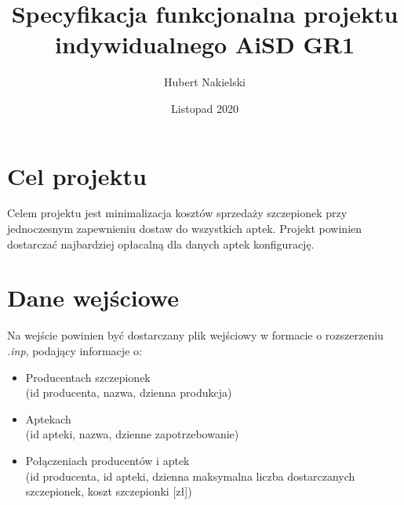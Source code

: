 \documentclass[]{article}
\title{Specyfikacja funkcjonalna projektu indywidualnego \textbf{AiSD GR1}}
\author{Hubert Nakielski}
\date{Listopad 2020}
\begin{document}
\maketitle

\section{Cel projektu}
Celem projektu jest minimalizacja kosztów sprzedaży szczepionek przy jednoczesnym
 zapewnieniu dostaw do wszystkich aptek. Projekt powinien dostarczać najbardziej opłacalną 
 dla danych aptek konfigurację.
 
\section{Dane wejściowe}
Na wejście powinien być dostarczany plik wejściowy w formacie o rozszerzeniu \textit{.inp}, podający informacje o: \\
	\begin{itemize}
		\item
		Producentach szczepionek \\
		(id producenta, nazwa, dzienna produkcja)\\
		\item
		Aptekach\\ (id apteki, nazwa, dzienne zapotrzebowanie)\\
		\item
		Połączeniach producentów i aptek \\(id producenta, id apteki, dzienna maksymalna liczba dostarczanych szczepionek, koszt 
		szczepionki [zł])
	\end{itemize}

\begin{table}[h!]
	\caption{Producenci }
\end{table}
\end{document}
